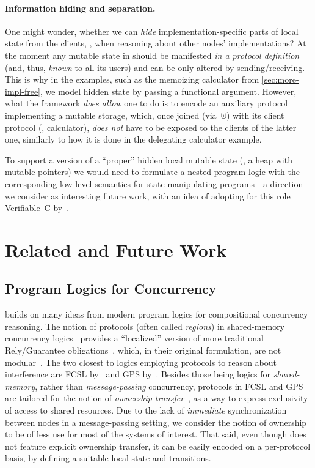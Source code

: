 \paragraph{Information hiding and separation.~}

One might wonder, whether we can \emph{hide} implementation-specific
parts of local state from the clients, \eg, when reasoning about other
nodes' implementations?
%
At the moment any mutable state in \disel should be manifested
\emph{in a protocol definition} (and, thus, \emph{known} to all its
users) and can be only altered by sending/receiving. This is why in
the examples, such as the memoizing calculator from
\cref{sec:more-impl-free}, we model hidden state by passing a
functional argument. However, what the framework \emph{does allow} one
to do is to encode an auxiliary protocol implementing a mutable
storage, which, once joined (via~$\uplus$) with its client protocol
(\eg, calculator), \emph{does not} have to be exposed to the clients
of the latter one, similarly to how it is done in the delegating
calculator example.

To support a version of a ``proper'' hidden local mutable state (\ie,
a heap with mutable pointers) we would need to formulate a nested
program logic with the corresponding low-level semantics for
state-manipulating programs---a direction we consider as interesting
future work, with an idea of adopting for this role Verifiable~C
by~\citet{Appel-al:BOOK14}.


\section{Related and Future Work}
\label{sec:related}

\subsection{Program Logics for Concurrency}

\disel builds on many ideas from modern program logics for
compositional concurrency reasoning.
%
The notion of protocols (often called \emph{regions}) in shared-memory
concurrency
logics~\cite{Turon-al:POPL13,DinsdaleYoung-al:ECOOP10,Nanevski-al:ESOP14,Turon-al:OOPSLA14,Raad-al:ESOP15,Svendsen-Birkedal:ESOP14}
provides a ``localized'' version of more traditional Rely/Guarantee
obligations~\cite{Jones:TOPLAS83}, which, in their original
formulation, are not
modular~\cite{Vafeiadis-Parkinson:CONCUR07,Feng:POPL09,Feng-al:ESOP07}.
%
The two closest to \disel logics employing protocols to reason about
interference are FCSL by~\citet{Nanevski-al:ESOP14} and GPS
by~\citet{Turon-al:OOPSLA14}. Besides those being logics for
\emph{shared-memory}, rather than \emph{message-passing} concurrency,
protocols in FCSL and GPS are tailored for the notion of
\emph{ownership transfer}~\cite{OHearn:TCS07}, as a way to express
exclusivity of access to shared resources.
%
Due to the lack of \emph{immediate} synchronization between nodes in a
message-passing setting, we consider the notion of ownership to be of
less use for most of the systems of interest. That said, even though
\disel does not feature explicit ownership transfer, it can be easily
encoded on a per-protocol basis, by defining a suitable local state
and transitions.

